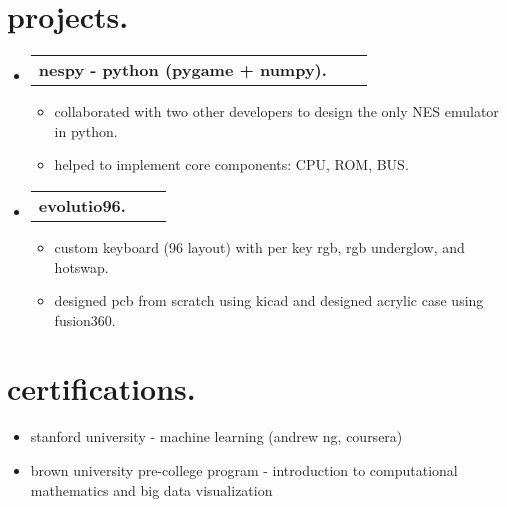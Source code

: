 \documentclass[a4paper,11pt]{article}
\makeatletter
\newcommand{\resumeItem}[1]{
  \item\small{#1}
}
\newcommand{\resumeItemListStart}{\begin{itemize}[rightmargin=0.11in]}
\newcommand{\resumeItemListEnd}{\end{itemize}}
\newcommand{\resumeTrioHeading}[3]{
  \item\small{
    \begin{tabular*}{0.96\textwidth}[t]{
      l@{\extracolsep{\fill}}c@{\extracolsep{\fill}}r
    }
      \textbf{#1} & \textit{#2} & #3
    \end{tabular*}
  }
}
\newcommand{\resumeHeadingListStart}{
  \begin{itemize}[leftmargin=0.15in, label={}]
}
\newcommand{\resumeHeadingListEnd}{\end{itemize}}
\makeatother
\begin{document}

\section{projects.}
  \resumeHeadingListStart{}
    \resumeTrioHeading{nespy - python (pygame + numpy).}{}{}
      \resumeItemListStart{}
        \resumeItem{collaborated with two other developers to design the only NES emulator in python.}
        \resumeItem{helped to implement core components: CPU, ROM, BUS.}
      \resumeItemListEnd{}

    \resumeTrioHeading{evolutio96.}{}{}
      \resumeItemListStart{}
        \resumeItem{custom keyboard (96 layout) with per key rgb, rgb underglow, and hotswap.}
        \resumeItem{designed pcb from scratch using kicad and designed acrylic case using fusion360.}
      \resumeItemListEnd{}
  \resumeHeadingListEnd{}



\section{certifications.}
  \resumeItemListStart{}
    \resumeItem{{{stanford university - machine learning (andrew ng, coursera)}}}
    \resumeItem{{{brown university pre-college program - introduction to computational mathematics and big data visualization}}}
  \resumeItemListEnd{}
\end{document}
